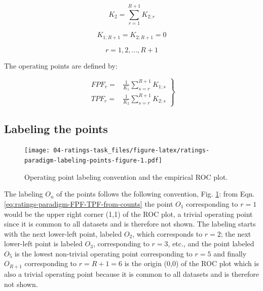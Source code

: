 \documentclass[
]{book}
\begin{document}
\begin{equation*} 
K_2=\sum_{r=1}^{R+1}K_{2;r}
\end{equation*}

\begin{equation*} 
K_{1;R+1} = K_{2;R+1} = 0
\end{equation*}

\begin{equation*} 
r = 1,2,...,R+1
\end{equation*}

The operating points are defined by:

\begin{equation}
\left. 
\begin{aligned}
FPF_r=& \frac {1} {K_1} \sum_{s=r}^{R+1}K_{1;s}\\
TPF_r=& \frac {1} {K_2} \sum_{s=r}^{R+1}K_{2;s}
\end{aligned}
\right \}
\label{eq:ratings-paradigm-FPF-TPF-from-counts}
\end{equation}

\hypertarget{labeling-the-points}{%
\subsection{Labeling the points}\label{labeling-the-points}}

\begin{figure}
\centering
\texttt{[image: 04-ratings-task\_files/figure-latex/ratings-paradigm-labeling-points-figure-1.pdf]}
\caption{\label{fig:ratings-paradigm-labeling-points-figure}Operating point labeling convention and the empirical ROC plot.}
\end{figure}

The labeling \(O_n\) of the points follows the following convention, Fig. \ref{fig:ratings-paradigm-labeling-points-figure}: from Eqn. \eqref{eq:ratings-paradigm-FPF-TPF-from-counts} the point \(O_1\) corresponding to \(r=1\) would be the upper right corner (1,1) of the ROC plot, a trivial operating point since it is common to all datasets and is therefore not shown. The labeling starts with the next lower-left point, labeled \(O_2\), which corresponds to \(r=2\); the next lower-left point is labeled \(O_3\), corresponding to \(r=3\), etc., and the point labeled \(O_5\) is the lowest non-trivial operating point corresponding to \(r=5\) and finally \(O_{R+1}\) corresponding to \(r=R+1=6\) is the origin (0,0) of the ROC plot which is also a trivial operating point because it is common to all datasets and is therefore not shown.
\end{document}
